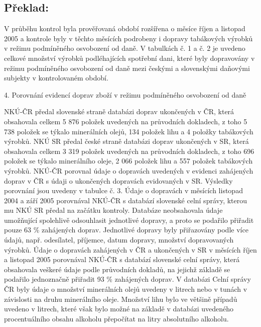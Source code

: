 \documentclass[10pt]{article}
\begin{document}
\pagebreak

\subsection*{Překlad:}

V průběhu kontrol byla prověřovaná období rozšířena o měsíce říjen a listopad 2005 a kontrole byly v těchto měsících podrobeny i dopravy tabákových výrobků v režimu podmíněného osvobození od daně.
V tabulkách č. 1 a č. 2 je uvedeno celkové množství výrobků podléhajících spotřební dani, které byly dopravovány v režimu podmíněného osvobození od daně mezi českými a slovenskými daňovými subjekty v kontrolovaném období.


4. Porovnání evidencí doprav zboží v režimu podmíněného osvobození od daně

NKÚ-ČR předal slovenské straně databázi doprav ukončených v ČR, která obsahovala celkem 5 876 položek uvedených na průvodních dokladech, z toho 5 738 položek se týkalo minerálních olejů, 134 položek lihu a 4 položky tabákových výrobků.
NKÚ SR předal české straně databázi doprav ukončených v SR, která obsahovala celkem 3 319 položek uvedených na průvodních dokladech, z toho 696 položek se týkalo minerálního oleje, 2 066 položek lihu a 557 položek tabákových výrobků.
NKÚ-ČR porovnal údaje o dopravách uvedených v evidenci zahájených doprav v ČR s údaji o ukončených dopravách evidovaných v SR.
Výsledky porovnání jsou uvedeny v tabulce č. 3.
Údaje o dopravách v měsících listopad 2004 a září 2005 porovnával NKÚ-ČR s databází slovenské celní správy, kterou mu NKÚ SR předal na začátku kontroly.
Databáze neobsahovala údaje umožňující spolehlivě odsouhlasit jednotlivé dopravy, a proto se podařilo přiřadit pouze 63 \% zahájených doprav.
Jednotlivé dopravy byly přiřazovány podle více údajů, např. odesílatel, příjemce, datum dopravy, množství dopravovaných výrobků.
Údaje o dopravách zahájených v ČR a ukončených v SR v měsících říjen a listopad 2005 porovnával NKÚ-ČR s databází slovenské celní správy, která obsahovala veškeré údaje podle průvodních dokladů, na jejichž základě se podařilo jednoznačně přiřadit 93 \% zahájených doprav.
V databázi Celní správy ČR byly údaje o množství minerálních olejů uvedeny v litrech nebo v tunách v závislosti na druhu minerálního oleje.
Množství lihu bylo ve většině případů uvedeno v litrech, které však bylo možné na základě v databázi uvedeného procentuálního obsahu alkoholu přepočítat na litry absolutního alkoholu.
\end{document}
